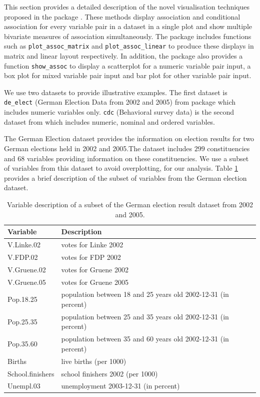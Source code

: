This section provides a detailed description of the novel visualisation
techniques proposed in the package . These methods
display association and conditional association for every variable pair
in a dataset in a single plot and show multiple bivariate measures of
association simultaneously. The package includes functions such as
\texttt{plot\_assoc\_matrix} and \texttt{plot\_assoc\_linear} to produce
these displays in matrix and linear layout respectively. In addition,
the package also provides a function \texttt{show\_assoc} to display a
scatterplot for a numeric variable pair input, a box plot for mixed
variable pair input and bar plot for other variable pair input.

We use two datasets to provide illustrative examples. The first dataset
is \texttt{de\_elect} (German Election Data from 2002 and 2005) from
 package which includes numeric variables only.
\texttt{cdc} (Behavioral survey data) is the second dataset from
\citet{diez2012openintro} which includes numeric, nominal and ordered
variables.

The German Election dataset provides the information on election results
for two German elections held in 2002 and 2005.The dataset includes
\(299\) constituencies and \(68\) variables providing information on
these constituencies. We use a subset of variables from this dataset to
avoid overplotting, for our analysis. Table \ref{tab:germanelection}
provides a brief description of the subset of variables from the German
election dataset.

\begin{Schunk}
\begin{table}

\caption{\label{tab:germanelection}Variable description of a subset of the German election result dataset from 2002 and 2005.}
\centering
\begin{tabular}[t]{ll}
\toprule
Variable & Description\\
\midrule
V.Linke.02 & votes for Linke 2002\\
V.FDP.02 & votes for FDP 2002\\
V.Gruene.02 & votes for Gruene 2002\\
V.Gruene.05 & votes for Gruene 2005\\
Pop.18.25 & population between 18 and 25 years old 2002-12-31 (in percent)\\
\addlinespace
Pop.25.35 & population between 25 and 35 years old 2002-12-31 (in percent)\\
Pop.35.60 & population between 35 and 60 years old 2002-12-31 (in percent)\\
Births & live births (per 1000)\\
School.finishers & school finishers 2002 (per 1000)\\
Unempl.03 & unemployment 2003-12-31 (in percent)\\
\bottomrule
\end{tabular}
\end{table}

\end{Schunk}

